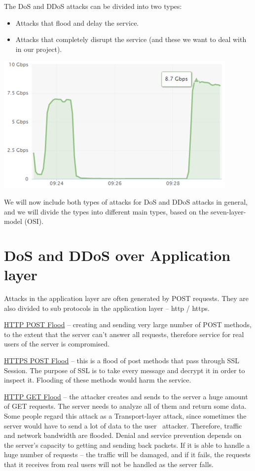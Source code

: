 \documentclass{report}
\begin{document}
\hfill \break The DoS and DDoS attacks can be divided into two types: 
\begin{itemize}
\item 	Attacks that flood and delay the service.
\item	Attacks that completely disrupt the service (and these we want to deal with in our project).

\end{itemize}
    \begin{center}
        \includegraphics{ddos-attack-traffic-gbps}
    \end{center}


 \hfill \break
 \hfill \break We will now include both types of attacks for DoS and DDoS attacks in general, and we will divide the types into different main types, based on the seven-layer-model (OSI).



\section {DoS and DDoS over Application layer} 
 \hfill \break Attacks in the application layer are often generated by POST requests. They are also divided to sub protocols in the application layer – http / https.

 \hfill \break \underline{HTTP POST Flood} – creating and sending very large number of POST methods, to the extent that the server can't answer all requests, therefore service for real users of the server is compromised.

 \hfill \break\underline{HTTPS POST Flood} – this is a flood of post methods that pass through SSL Session. The purpose of SSL is to take every message and decrypt it in order to inspect it. Flooding of these methods would harm the service.

 \hfill \break\underline{HTTP GET Flood} – the attacker creates and sends to the server a huge amount of GET requests. The server needs to analyze all of them and return some data. Some people regard this attack as a Transport-layer attack, since sometimes the server would have to send a lot of data to the user \ attacker. Therefore, traffic and network bandwidth are flooded. Denial and service prevention depends on the server’s capacity to getting and sending back packets. If it is able to handle a huge number of requests – the traffic will be damaged, and if it fails, the requests that it receives from real users will not be handled as the server falls.
\end{document}
